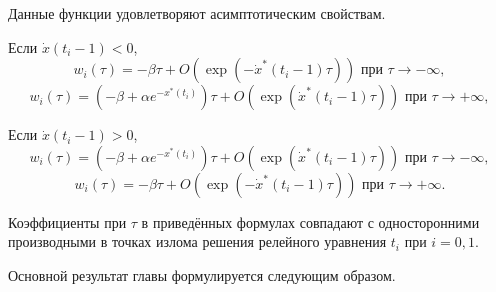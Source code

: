 Данные функции удовлетворяют асимптотическим свойствам.

Если $\dot{x}(t_i - 1) < 0$,
\begin{equation*}
	w_i(\tau) = -\beta \tau + O(\exp(-\dot{x}^*(t_i - 1) \tau)) \text{ при } \tau \to -\infty,
\end{equation*}
\begin{equation*}
	w_i(\tau) = (-\beta + \alpha e^{-x^*(t_i)})\tau + O(\exp(\dot{x}^*(t_i - 1) \tau)) \text{ при } \tau \to +\infty,
\end{equation*}

Если $\dot{x}(t_i - 1) > 0$,
\begin{equation*}
	w_i(\tau) = (-\beta + \alpha e^{-x^*(t_i)})\tau + O(\exp(\dot{x}^*(t_i - 1) \tau)) \text{ при } \tau \to -\infty,
\end{equation*}
\begin{equation*}
	w_i(\tau) = -\beta \tau + O(\exp(-\dot{x}^*(t_i - 1) \tau)) \text{ при } \tau \to +\infty.
\end{equation*}

Коэффициенты при $\tau$ в приведённых формулах совпадают с односторонними производными в точках излома решения релейного уравнения $t_i$ при $i = 0, 1$.

Основной результат главы формулируется следующим образом.
	
\bigskip

